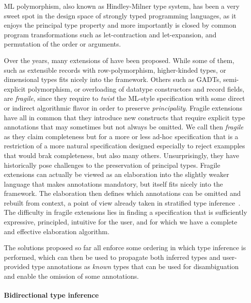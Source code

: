 \documentclass[acmsmall,screen,nonacm]{acmart}
\begin{document}
ML polymorphism, also known as Hindley-Milner type system, has been a very
sweet spot in the design space of strongly typed programming languages, as
it enjoys the principal type property and more importantly is closed by
common program transformations such as let-contraction and let-expansion,
and permutation of the order or arguments.

Over the years, many extensions of \ML have been proposed.  While some of
them, such as extensible records with row-polymorphism, higher-kinded types,
or dimensional types fits nicely into the \ML framework. Others such as
GADTs, semi-explicit polymorphism, or overloading of datatype constructors
and record fields, are 
\emph{fragile}, since they require to \emph{twist} the ML-style
specification with some direct or indirect algorithmic flavor in order to
preserve \emph{principality}.  Fragile extensions have all in common that
they introduce new constructs that require explicit type annotations that
may sometimes but not always be omitted. We call then \emph{fragile} as they
claim completeness but for a more or less ad-hoc specification that is a
restriction of a more natural specification designed especially to reject
exampples that would brak completeness, but also many others.
Unsurprisingly, they have historically pose challenges to the preservation
of principal types.  Fragile extensions can actually be viewed as an
elaboration into the slightly weaker language that makes annotations
mandatory, but itself fits nicely into the
\ML framework. The elaboration then defines which annotations can be omitted
and rebuilt from context, a point of view already taken in stratified type
inference~\cite {Pottier-Regis-Gianas/stratified@popl06}.
%
The difficulty in fragile extensions lies in finding a specification that is
sufficiently expressive, principled, intuitive for the user, and for which
we have a complete and effective elaboration algorithm.

The solutions proposed so far all enforce some ordering in which type
inference is performed, which can then be used to propagate both inferred
types and user-provided type annotations as \emph{known} types that can be
used for disambiguation and enable the omission of some annotations.

\paragraph{Bidirectional type inference}
\end{document}
